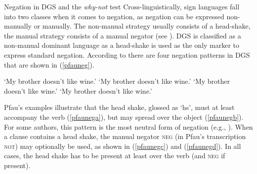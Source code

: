 
\begin{digression}{Negation in DGS and the \textit{why-not} test}{}
\noindent Cross-linguistically, sign languages fall into two classes when it comes to negation, as negation can be expressed non-manually or manually. The non-manual strategy usually consists of a head-shake, the manual strategy consists of a manual negator (see \citealt{zeshan2004negation}). DGS is classified as a non-manual dominant language as a head-shake is used as the only marker to express standard negation. According to \citet[55]{pfau2016featural} there are four negation patterns in DGS that are shown in (\ref{pfauneg}).


\begin{exe}
\ex\label{pfauneg}\begin{xlist}
\ex {} 
\glt `My brother doesn't like wine.' \label{pfaunega}
\ex {} 
%
\glt `My brother doesn't like wine.' \label{pfaunegb}
\ex {} 
%
\glt `My brother doesn't like wine.' \label{pfaunegc}
\ex {} 
%
\glt `My brother doesn't like wine.' \label{pfaunegd}


\end{xlist}
\end{exe}

\noindent Pfau's examples illustrate that the head shake, glossed as `hs', must at least accompany the verb (\ref{pfaunega}), but may spread over the object (\ref{pfaunegb}). For some authors, this pattern is the most neutral form of negation (e.g., \citealt{happ2014vork}). When a clause contains a head shake, the manual negator \textsc{neg} (in Pfau's transcription \textsc{not}) may optionally be used, as shown in (\ref{pfaunegc}) and (\ref{pfaunegd}). In all cases, the head shake has to be present at least over the verb (and \textsc{neg} if present).


\end{digression}
